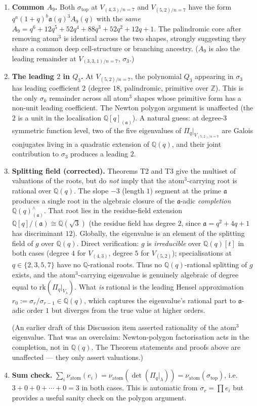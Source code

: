 \documentclass[11pt]{article}
\theoremstyle{plain}
\theoremstyle{definition}
\theoremstyle{remark}
\newcommand{\Z}{\mathbb{Z}}
\newcommand{\Q}{\mathbb{Q}}
\newcommand{\Pibs}{\Pi_q}
\newcommand{\Vlam}{V_\lambda}
\newcommand{\rk}{\mathrm{rk}}
\newcommand{\val}{\nu_{\mathrm{atom}}}
\newcommand{\atom}{\mathfrak{a}}
\begin{document}
\begin{enumerate}
\item \textbf{Common $A_9$.}  Both $\sigma_{\mathrm{top}}$ at $V_{(4,3)/n=7}$ and
$V_{(5,2)/n=7}$ have the form $q^a (1+q)^b \atom(q)^3 A_9(q)$ with the \emph{same}
$A_9 = q^6 + 12q^5 + 52q^4 + 88q^3 + 52q^2 + 12q + 1$.  The palindromic core after
removing atom$^3$ is identical across the two shapes, strongly suggesting they share
a common deep cell-structure or branching ancestry.  ($A_9$ is also the leading
remainder at $V_{(3,3,1)/n=7}$, $\sigma_3$.)

\item \textbf{The leading $2$ in $Q_3$.}  At $V_{(5,2)/n=7}$, the polynomial $Q_3$
appearing in $\sigma_3$ has leading coefficient $2$ (degree $18$, palindromic, primitive
over $\Z$).  This is the only $\sigma_k$ remainder across all atom$^3$ shapes whose
primitive form has a non-unit leading coefficient.  The Newton polygon argument is
unaffected (the $2$ is a unit in the localisation $\Q[q]_{(\atom)}$).  A natural
guess: at degree-$3$ symmetric function level, two of the five eigenvalues of
$\Pibs|_{V_{(5,2)/n=7}}$ are Galois conjugates living in a quadratic extension of
$\Q(q)$, and their joint contribution to $\sigma_3$ produces a leading $2$.

\item \textbf{Splitting field (corrected).}  Theorems T2 and T3 give the
multiset of valuations of the roots, but do \emph{not} imply that the
atom$^3$-carrying root is rational over $\Q(q)$.  The slope $-3$ (length $1$)
segment at the prime $\atom$ produces a single root in the algebraic closure of
the $\atom$-adic \emph{completion} $\Q(q)_{(\atom)}^\wedge$.  That root lies in
the residue-field extension $\Q[q]/(\atom) \cong \Q(\sqrt 3)$ (the residue field
has degree $2$, since $\atom = q^2+4q+1$ has discriminant $12$).  Globally, the
eigenvalue is an element of the splitting field of $g$ over $\Q(q)$.  Direct
verification: $g$ is \emph{irreducible} over $\Q(q)[t]$ in both cases (degree
$4$ for $V_{(4,3)}$, degree $5$ for $V_{(5,2)}$); specialisations at
$q\in\{2,3,5,7\}$ have no $\Q$-rational roots.  Thus no $\Q(q)$-rational
splitting of $g$ exists, and the atom$^3$-carrying eigenvalue is genuinely
algebraic of degree equal to $\rk(\Pibs|_{\Vlam})$.  What \emph{is} rational is
the leading Hensel approximation $r_0 := \sigma_r/\sigma_{r-1} \in \Q(q)$,
which captures the eigenvalue's rational part to $\atom$-adic order $1$ but
diverges from the true value at higher orders.

(An earlier draft of this Discussion item asserted rationality of the
atom$^3$ eigenvalue.  That was an overclaim: Newton-polygon factorisation
\cite[Ch.~II,~Cor.~6.5]{Neukirch} acts in the completion, not in $\Q(q)$.
The Theorem statements and proofs above are unaffected — they only assert
valuations.)

\item \textbf{Sum check.}  $\sum_i \val(e_i) = \val(\det(\Pibs|_\lambda)) =
\val(\sigma_{\mathrm{top}})$, i.e.\ $3 + 0 + 0 + \cdots + 0 = 3$ in both cases.
This is automatic from $\sigma_r = \prod e_i$ but provides a useful sanity check
on the polygon argument.
\end{enumerate}
\end{document}
